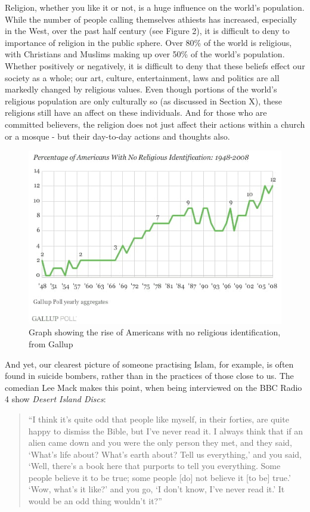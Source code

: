 \documentclass[]{article}
\begin{document}
Religion, whether you like it or not, is a huge influence on the world's
population. While the number of people calling themselves athiests has
increased, especially in the West, over the past half century (see
Figure 2), it is difficult to deny to importance of religion in the
public sphere. Over 80\% of the world is religious, with Christians and
Muslims making up over 50\% of the world's
population\autocite{HackettChristiansremainworld2017}. Whether
positively or negatively, it is difficult to deny that these beliefs
effect our society as a whole; our art, culture, entertainment, laws and
politics are all markedly changed by religious values. Even though
portions of the world's religious population are only culturally so (as
discussed in Section X), these religions still have an affect on these
individuals. And for those who are committed believers, the religion
does not just affect their actions within a church or a mosque - but
their day-to-day actions and thoughts also.

\begin{figure}
\centering
\includegraphics{./NonesRise.jpg}
\caption{Graph showing the rise of Americans with no religious
identification, from Gallup\autocite{GallupThisEasterSmaller}}
\end{figure}

And yet, our clearest picture of someone practising Islam, for example,
is often found in suicide bombers, rather than in the practices of those
close to us. The comedian Lee Mack makes this point, when being
interviewed on the BBC Radio 4 show \emph{Desert Island Discs}:

\begin{quote}
``I think it's quite odd that people like myself, in their forties, are
quite happy to dismiss the Bible, but I've never read it. I always think
that if an alien came down and you were the only person they met, and
they said, `What's life about? What's earth about? Tell us everything,'
and you said, `Well, there's a book here that purports to tell you
everything. Some people believe it to be true; some people {[}do{]} not
believe it {[}to be{]} true.' `Wow, what's it like?' and you go, `I
don't know, I've never read it.' It would be an odd thing wouldn't
it?''\autocite{BBCRadio4DesertIslandDiscs13}
\end{quote}
\end{document}
